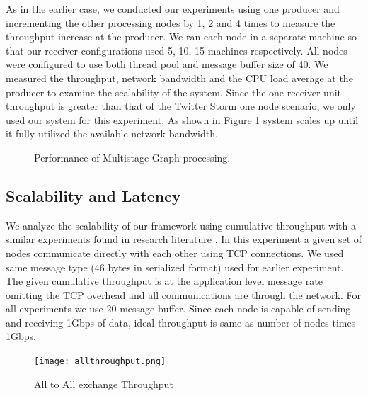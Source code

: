 As in the earlier case, we conducted our experiments using one producer and incrementing the other processing nodes by 1, 2 and 4 times to measure the throughput increase at the producer. We ran each node in a separate machine so that our receiver configurations used 5, 10, 15 machines respectively. All nodes were configured to use both thread pool and message buffer size of 40. We measured the throughput, network bandwidth and the CPU load average at the producer to examine the scalability of the system. Since the one receiver unit throughput is greater than that of the Twitter Storm \cite{toshniwal2014storm} one node scenario, we only used our system for this experiment. As shown in Figure \ref{scalability} system scales up until it fully utilized the available network bandwidth.
 
\begin{figure}[!t]
        \centering
        \hfil
        \hfil
        \hfil
        \caption{Performance of Multistage Graph processing.}
        \label{scalability}
\end{figure}

\subsection{Scalability and Latency}
We analyze the scalability of our framework using cumulative throughput with a similar experiments found in research literature \cite{murray2013naiad} \cite{zaharia2013discretized}.  In this experiment a given set of nodes communicate directly with each other using TCP connections.  We used same message type (46 bytes in serialized format) used for earlier experiment. The given cumulative throughput is at the application level message rate omitting the TCP overhead and all communications are through the network. For all experiments we use 20 message buffer. Since each node is capable of sending and receiving 1Gbps of data, ideal throughput is same as number of nodes times 1Gbps. 

\begin{figure}[!t]
        \centering
        \texttt{[image: allthroughput.png]}
        \caption{All to All exchange Throughput}
        \label{allthroughput}
\end{figure}

